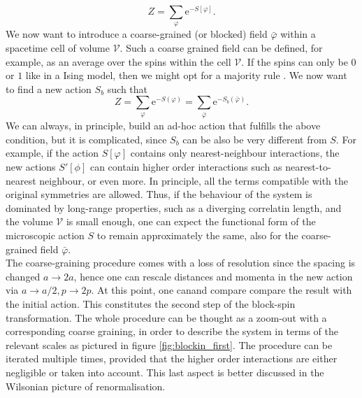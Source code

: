 \begin{equation*}
    Z=\sum_{\varphi} \mathrm{e}^{-S[\varphi]}.
\end{equation*}
We now want to introduce a coarse-grained (or blocked) field $\bar\varphi$ within a spacetime cell of volume $\mathcal{V}$. Such a coarse grained field can be defined, for example, as an average over the spins within the cell $\mathcal{V}$. If the spins can only be $0$ or $1$ like in a Ising model, then we might opt for a majority rule \cite{cardy_1996}.
We now want to find a new action $S_b$ such that 
\begin{equation}
    Z=\sum_{\varphi} \mathrm{e}^{-S(\varphi)}= \sum_{\bar\varphi} \mathrm{e}^{-S_b\left(\bar\varphi\right)}.
\end{equation}
We can always, in principle, build an ad-hoc action that fulfills the above condition, but it is complicated, since $S_b$ can be also be very different from $S$. For example, if the action $S[\varphi]$ contains only nearest-neighbour interactions, the new actions $S'[\phi]$ can contain higher order interactions such as nearest-to-nearest neighbour, or even more. In principle, all the terms compatible with the original symmetries are allowed. 
Thus, if the behaviour of the system is dominated by long-range properties, such as a diverging correlatin length, and the volume $\mathcal{V}$ is small enough, one can expect the functional form of the microscopic action $S$ to remain approximately the same, also for the coarse-grained field $\bar\varphi$. \\
The coarse-graining procedure comes with a loss of resolution since the spacing is changed $a \to 2a$, hence one can rescale distances and momenta in the new action via $a \to a/2, p \to 2p$. At this point, one canand compare compare the result with the initial action. This constitutes the second step of the block-spin transformation. The whole procedure can be thought as a zoom-out with a corresponding coarse graining, in order to describe the system in terms of the relevant scales as pictured in figure \ref{fig:blockin_first}. The procedure can be iterated multiple times, provided that the higher order interactions are either negligible or taken into account. 
This last aspect is better discussed in the Wilsonian picture of renormalisation. \\

